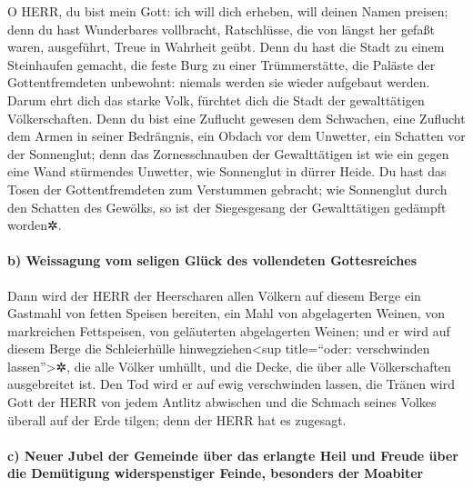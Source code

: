 O HERR, du bist mein Gott: ich will dich erheben, will
deinen Namen preisen; denn du hast Wunderbares vollbracht, Ratschlüsse,
die von längst her gefaßt waren, ausgeführt, Treue in Wahrheit geübt.
Denn du hast die Stadt zu einem Steinhaufen gemacht, die
feste Burg zu einer Trümmerstätte, die Paläste der Gottentfremdeten
unbewohnt: niemals werden sie wieder aufgebaut werden.
Darum ehrt dich das starke Volk, fürchtet dich die Stadt
der gewalttätigen Völkerschaften. Denn du bist eine
Zuflucht gewesen dem Schwachen, eine Zuflucht dem Armen in seiner
Bedrängnis, ein Obdach vor dem Unwetter, ein Schatten vor der
Sonnenglut; denn das Zornesschnauben der Gewalttätigen ist wie ein gegen
eine Wand stürmendes Unwetter, wie Sonnenglut in dürrer
Heide. Du hast das Tosen der Gottentfremdeten zum Verstummen gebracht;
wie Sonnenglut durch den Schatten des Gewölks, so ist der Siegesgesang
der Gewalttätigen gedämpft worden✲.

\hypertarget{b-weissagung-vom-seligen-gluxfcck-des-vollendeten-gottesreiches}{%
\paragraph{b) Weissagung vom seligen Glück des vollendeten
Gottesreiches}\label{b-weissagung-vom-seligen-gluxfcck-des-vollendeten-gottesreiches}}

Dann wird der HERR der Heerscharen allen Völkern auf
diesem Berge ein Gastmahl von fetten Speisen bereiten, ein Mahl von
abgelagerten Weinen, von markreichen Fettspeisen, von geläuterten
abgelagerten Weinen; und er wird auf diesem Berge die
Schleierhülle hinwegziehen\textless sup title=``oder: verschwinden
lassen''\textgreater✲, die alle Völker umhüllt, und die Decke, die über
alle Völkerschaften ausgebreitet ist. Den Tod wird er auf
ewig verschwinden lassen, die Tränen wird Gott der HERR von jedem
Antlitz abwischen und die Schmach seines Volkes überall auf der Erde
tilgen; denn der HERR hat es zugesagt.

\hypertarget{c-neuer-jubel-der-gemeinde-uxfcber-das-erlangte-heil-und-freude-uxfcber-die-demuxfctigung-widerspenstiger-feinde-besonders-der-moabiter}{%
\paragraph{c) Neuer Jubel der Gemeinde über das erlangte Heil und Freude
über die Demütigung widerspenstiger Feinde, besonders der
Moabiter}\label{c-neuer-jubel-der-gemeinde-uxfcber-das-erlangte-heil-und-freude-uxfcber-die-demuxfctigung-widerspenstiger-feinde-besonders-der-moabiter}}

